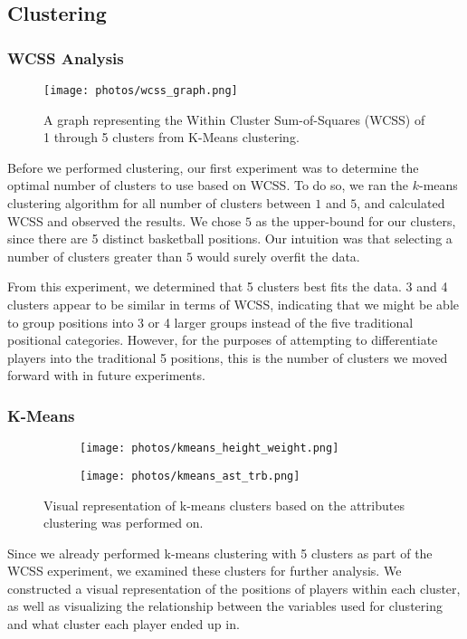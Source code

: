 \documentclass[./main.tex]{subfiles}
\begin{document}
\subsection{Clustering}
\subsubsection{WCSS Analysis}
\begin{wrapfigure}{r}{5.5cm}
    \centering
    \texttt{[image: photos/wcss\_graph.png]}
    \caption{A graph representing the Within Cluster Sum-of-Squares (WCSS) of 1 through 5 clusters from K-Means clustering.}
    \label{fig:wcss_graph}
\end{wrapfigure}
Before we performed clustering, our first experiment was to determine the optimal number of clusters to use based on WCSS. To do so, we ran the $k$-means clustering algorithm for all number of clusters between $1$ and $5$, and calculated WCSS and observed the results. We chose $5$ as the upper-bound for our clusters, since there are 5 distinct basketball positions. Our intuition was that selecting a number of clusters greater than $5$ would surely overfit the data.

From this experiment, we determined that 5 clusters best fits the data. 3 and 4 clusters appear to be similar in terms of WCSS, indicating that we might be able to group positions into 3 or 4 larger groups instead of the five traditional positional categories. However, for the purposes of attempting to differentiate players into the traditional 5 positions, this is the number of clusters we moved forward with in future experiments.

\subsubsection{K-Means}
\begin{figure}[h]
\centering
\begin{subfigure}{.4\textwidth}
    \texttt{[image: photos/kmeans\_height\_weight.png]}
\end{subfigure}
\begin{subfigure}{.4\textwidth}
    \texttt{[image: photos/kmeans\_ast\_trb.png]}
\end{subfigure}
\caption{Visual representation of k-means clusters based on the attributes clustering was performed on.}
\label{fig:kmeans_analysis}
\end{figure}
Since we already performed k-means clustering with 5 clusters as part of the WCSS experiment, we examined these clusters for further analysis. We constructed a visual representation of the positions of players within each cluster, as well as visualizing the relationship between the variables used for clustering and what cluster each player ended up in.
\end{document}
